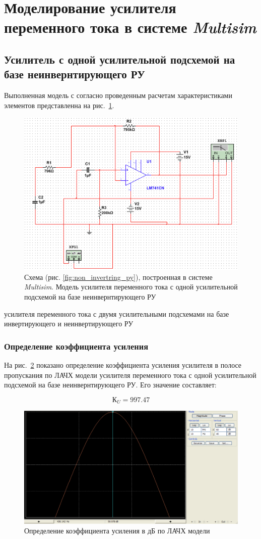 \section{Моделирование усилителя переменного тока в системе \textit{Multisim}}

\subsection{Усилитель с одной усилительной подсхемой на базе неинвернтирующего РУ}

Выполненная модель с согласно проведенным 
расчетам характеристиками элементов
представленна на рис.~\ref{fig:noninv_modeled}.

\begin{figure}[H]
	\centering
	\includegraphics[width=0.7\linewidth]{photo/noninv_modeled}
	\caption{
		Схема (рис. \ref{fig:non_invertring_py}), 
		построенная в системе \textit{Multisim}. 
		Модель 
		усилителя переменного тока 
		с одной усилительной подсхемой
		на базе неинвернтирующего РУ
	}
	\label{fig:noninv_modeled}
\end{figure}

усилителя переменного тока
с двумя усилительными подсхемами
на базе инвертирующего и неинвертирующего РУ

\subsubsection*{Определение коэффициента усиления}

На рис.~\ref{fig:plot_k_noninv_py} показано 
определение коэффициента усиления
усилителя в полосе пропускания
по ЛАЧХ модели
усилителя переменного тока
с одной усилительной подсхемой
на базе неинвернтирующего РУ.
Его значение составляет:

$$ К_U = 997.47 $$

\begin{figure}[H]
	\centering
	\includegraphics[width=0.7\linewidth]{photo/plot_k_noninv_py}
	\caption{Определение коэффициента усиления в дБ по ЛАЧХ модели}
	\label{fig:plot_k_noninv_py}
\end{figure}

